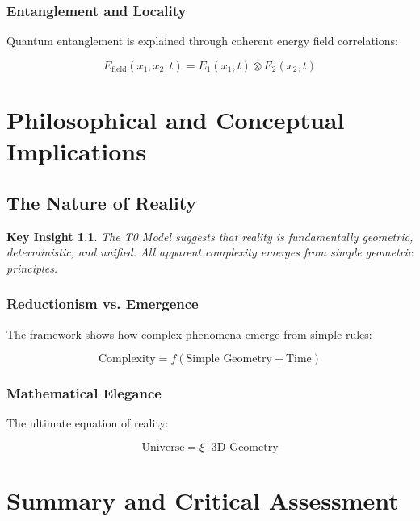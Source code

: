\documentclass[12pt,a4paper]{report}
\newtheorem{insight}{Key Insight}[chapter]
\begin{document}
	\subsection{Entanglement and Locality}
	
	Quantum entanglement is explained through coherent energy field correlations:
	
	\begin{equation}
		E_{\text{field}}(x_1, x_2, t) = E_1(x_1,t) \otimes E_2(x_2,t)
	\end{equation}
	
	\chapter{Philosophical and Conceptual Implications}
	
	\section{The Nature of Reality}
	
	\begin{insight}
		The T0 Model suggests that reality is fundamentally geometric, deterministic, and unified. All apparent complexity emerges from simple geometric principles.
	\end{insight}
	
	\subsection{Reductionism vs. Emergence}
	
	The framework shows how complex phenomena emerge from simple rules:
	
	\begin{equation}
		\text{Complexity} = f(\text{Simple Geometry} + \text{Time})
	\end{equation}
	
	\subsection{Mathematical Elegance}
	
	The ultimate equation of reality:
	
	\begin{equation}
		\boxed{\text{Universe} = \xi \cdot \text{3D Geometry}}
	\end{equation}
	
	\chapter{Summary and Critical Assessment}
	
\end{document}
